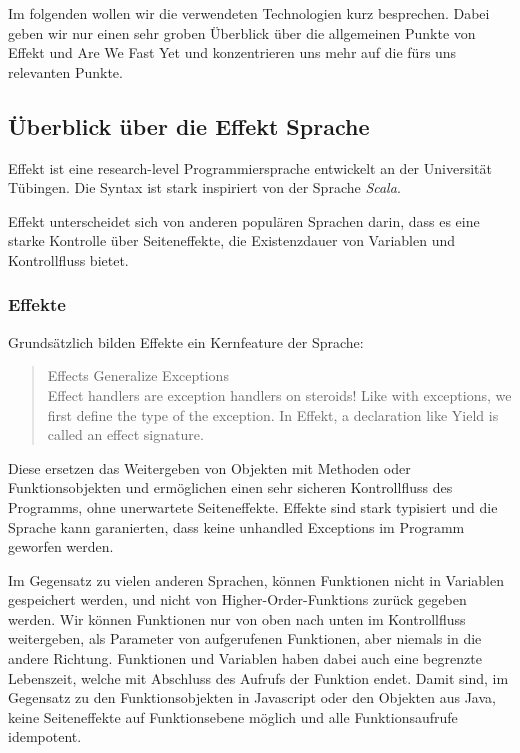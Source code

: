 Im folgenden wollen wir die verwendeten Technologien kurz besprechen.
Dabei geben wir nur einen sehr groben Überblick über die allgemeinen Punkte von Effekt und Are We Fast Yet und konzentrieren uns mehr auf die fürs uns relevanten Punkte.

\subsection{ Überblick über die Effekt Sprache  }	
Effekt ist eine research-level Programmiersprache entwickelt an der Universität Tübingen.
Die Syntax ist stark inspiriert von der Sprache \textit{Scala}.

Effekt unterscheidet sich von anderen populären Sprachen darin, dass es eine starke Kontrolle über Seiteneffekte, die Existenzdauer von Variablen und Kontrollfluss bietet.

\subsubsection{ Effekte }

Grundsätzlich bilden Effekte ein Kernfeature der Sprache:
\begin{quote}
    Effects Generalize Exceptions\\
    Effect handlers are exception handlers on steroids! Like with exceptions, we first define the type of the exception. In Effekt, a declaration like Yield is called an effect signature.
\end{quote}

Diese ersetzen das Weitergeben von Objekten mit Methoden oder Funktionsobjekten und ermöglichen einen sehr sicheren Kontrollfluss des Programms, ohne unerwartete Seiteneffekte.
Effekte sind stark typisiert und die Sprache kann garanierten, dass keine unhandled Exceptions im Programm geworfen werden.

Im Gegensatz zu vielen anderen Sprachen, können Funktionen nicht in Variablen gespeichert werden, und nicht von Higher-Order-Funktions zurück gegeben werden. Wir können Funktionen nur von oben nach unten im Kontrollfluss weitergeben, als Parameter von aufgerufenen Funktionen, aber niemals in die andere Richtung. Funktionen und Variablen haben dabei auch eine begrenzte Lebenszeit, welche mit Abschluss des Aufrufs der Funktion endet.
Damit sind, im Gegensatz zu den Funktionsobjekten in Javascript oder den Objekten aus Java, keine Seiteneffekte auf Funktionsebene möglich und alle Funktionsaufrufe idempotent.

